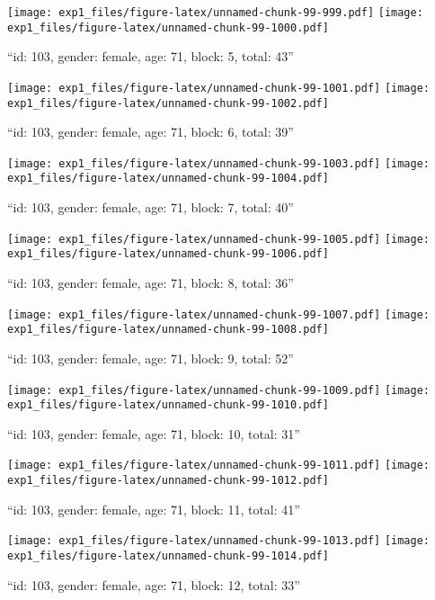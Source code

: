 \documentclass[,]{article}
\begin{document}
\texttt{[image: exp1\_files/figure-latex/unnamed-chunk-99-999.pdf]}
\texttt{[image: exp1\_files/figure-latex/unnamed-chunk-99-1000.pdf]}

\newpage
[1] 

``id: 103, gender: female, age: 71, block: 5, total: 43''

\texttt{[image: exp1\_files/figure-latex/unnamed-chunk-99-1001.pdf]}
\texttt{[image: exp1\_files/figure-latex/unnamed-chunk-99-1002.pdf]}

\newpage
[1] 

``id: 103, gender: female, age: 71, block: 6, total: 39''

\texttt{[image: exp1\_files/figure-latex/unnamed-chunk-99-1003.pdf]}
\texttt{[image: exp1\_files/figure-latex/unnamed-chunk-99-1004.pdf]}

\newpage
[1] 

``id: 103, gender: female, age: 71, block: 7, total: 40''

\texttt{[image: exp1\_files/figure-latex/unnamed-chunk-99-1005.pdf]}
\texttt{[image: exp1\_files/figure-latex/unnamed-chunk-99-1006.pdf]}

\newpage
[1] 

``id: 103, gender: female, age: 71, block: 8, total: 36''

\texttt{[image: exp1\_files/figure-latex/unnamed-chunk-99-1007.pdf]}
\texttt{[image: exp1\_files/figure-latex/unnamed-chunk-99-1008.pdf]}

\newpage
[1] 

``id: 103, gender: female, age: 71, block: 9, total: 52''

\texttt{[image: exp1\_files/figure-latex/unnamed-chunk-99-1009.pdf]}
\texttt{[image: exp1\_files/figure-latex/unnamed-chunk-99-1010.pdf]}

\newpage
[1] 

``id: 103, gender: female, age: 71, block: 10, total: 31''

\texttt{[image: exp1\_files/figure-latex/unnamed-chunk-99-1011.pdf]}
\texttt{[image: exp1\_files/figure-latex/unnamed-chunk-99-1012.pdf]}

\newpage
[1] 

``id: 103, gender: female, age: 71, block: 11, total: 41''

\texttt{[image: exp1\_files/figure-latex/unnamed-chunk-99-1013.pdf]}
\texttt{[image: exp1\_files/figure-latex/unnamed-chunk-99-1014.pdf]}

\newpage
[1] 

``id: 103, gender: female, age: 71, block: 12, total: 33''
\end{document}
